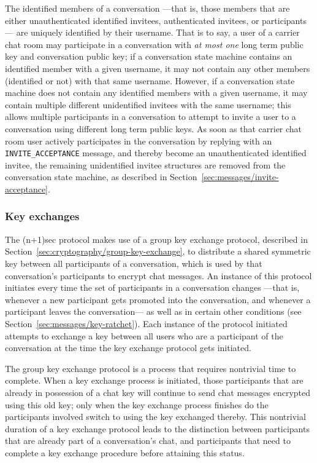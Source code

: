 \documentclass{article}
\def\npmessage#1{\texttt{#1}}
\begin{document}
The identified members of a conversation ---that is, those members that are either unauthenticated identified invitees, authenticated invitees, or participants--- are uniquely identified by their username.
That is to say, a user of a carrier chat room may participate in a conversation with \emph{at most one} long term public key and conversation public key; if a conversation state machine contains an identified member with a given username, it may not contain any other members (identified or not) with that same username.
However, if a conversation state machine does not contain any identified members with a given username, it may contain multiple different unidentified invitees with the same username; this allows multiple participants in a conversation to attempt to invite a user to a conversation using different long term public keys.
As soon as that carrier chat room user actively participates in the conversation by replying with an \npmessage{INVITE\_ACCEPTANCE} message, and thereby become an unauthenticated identified invitee, the remaining unidentified invitee structures are removed from the conversation state machine, as described in Section~\ref{sec:messages/invite-acceptance}.


\subsubsection{Key exchanges}
\label{sec:conversation-state-machine/contents/key-exchanges}

The (n+1)sec protocol makes use of a group key exchange protocol, described in Section~\ref{sec:cryptography/group-key-exchange}, to distribute a shared symmetric key between all participants of a conversation, which is used by that conversation's participants to encrypt chat messages.
An instance of this protocol initiates every time the set of participants in a conversation changes ---that is, whenever a new participant gets promoted into the conversation, and whenever a participant leaves the conversation--- as well as in certain other conditions (see Section~\ref{sec:messages/key-ratchet}).
Each instance of the protocol initiated attempts to exchange a key between all users who are a participant of the conversation at the time the key exchange protocol gets initiated.

The group key exchange protocol is a process that requires nontrivial time to complete.
When a key exchange process is initiated, those participants that are already in possession of a chat key will continue to send chat messages encrypted using this old key; only when the key exchange process finishes do the participants involved switch to using the key exchanged thereby.
This nontrivial duration of a key exchange protocol leads to the distinction between participants that are already part of a conversation's chat, and participants that need to complete a key exchange procedure before attaining this status.
\end{document}
